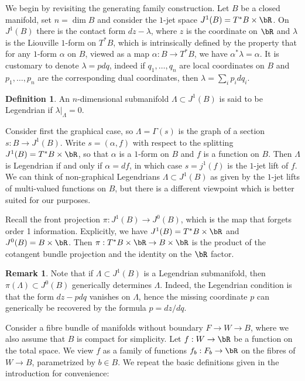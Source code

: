 \documentclass[JEP,XML,SOM,Unicode,NoFloatCountersInSection]{cedram}
\theoremstyle{plain}
\theoremstyle{definition}
\newtheorem{definition}[theorem]{Definition}
\newtheorem{remark}[theorem]{Remark}
\begin{document}
We begin by revisiting the generating family construction. Let $B$ be a closed manifold, set $n=\dim B$ and consider the $1$-jet space $J^1(B)=T^*B \times \bR$. On $J^1(B)$ there is the contact form $dz-\lambda$, where $z$ is the coordinate on $\bR$ and $\lambda$ is the Liouville $1$-form on $T^*B$, which is intrinsically defined by the property that for any $1$-form $\alpha$ on $B$, viewed as a map $\alpha: B \to T^*B$, we have $\alpha^*\lambda=\alpha$. It is customary to denote $\lambda=pdq$, indeed if $q_1,\ldots, q_n$ are local coordinates on $B$ and $p_1,\ldots,p_n$ are the corresponding dual coordinates, then $\lambda=\sum_i p_i dq_i$.

\begin{definition} An $n$-dimensional submanifold $\Lambda \subset J^1(B)$ is said to be Legendrian if $\lambda |_\Lambda=0$.
\end{definition}

Consider first the graphical case, so $\Lambda=\Gamma(s)$ is the graph of a section $s:B \to J^1(B)$. Write $s=(\alpha,f)$ with respect to the splitting $J^1(B)=T^*B \times \bR$, so that $\alpha$ is a $1$-form on $B$ and $f$ is a function on $B$. Then $\Lambda$ is Legendrian if and only if $\alpha=df$, in which case $s=j^1(f)$ is the $1$-jet lift of $f$. We can think of non-graphical Legendrians $\Lambda \subset J^1(B)$ as given by the $1$-jet lifts of multi-valued functions on $B$, but there is a different viewpoint which is better suited for our purposes.

Recall the front projection $\pi:J^1(B) \to J^0(B)$, which is the map that forgets order 1 information. Explicitly, we have $J^1(B)=T^*B \times \bR$ and $J^0(B)=B \times \bR$. Then $\pi : T^*B \times \bR \to B \times \bR$ is the product of the cotangent bundle projection and the identity on the $\bR$ factor.

\begin{remark} Note that if $\Lambda \subset J^1(B)$ is a Legendrian submanifold, then $\pi(\Lambda) \subset J^0(B)$ generically determines $\Lambda$. Indeed, the Legendrian condition is that the form $dz-pdq$ vanishes on $\Lambda$, hence the missing coordinate $p$ can generically be recovered by the formula $p=dz/dq$.
\end{remark}

Consider a fibre bundle of manifolds without boundary $F \to W \to B$, where we also assume that $B$ is compact for simplicity. Let $f:W \to \bR$ be a function on the total space. We view $f$ as a family of functions $f_b:F_b \to \bR$ on the fibres of $W \to B$, parametrized by $b \in B$. We repeat the basic definitions given in the introduction for convenience:
\end{document}
